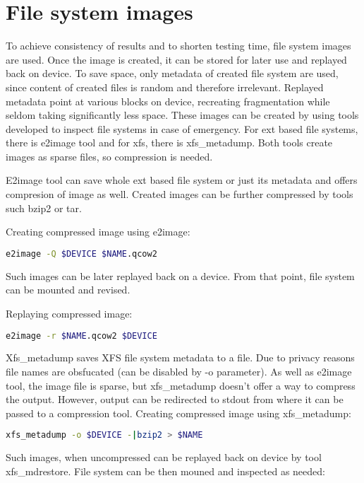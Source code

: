 \documentclass[
  color, %
  table, %
  lof,   %
  lot,   %
]{fithesis3}
\begin{document}
\section{File system images}
To achieve consistency of results and to shorten testing time, file system images are used. Once the image is created, it can be stored for later use and replayed back on device. To save space, only metadata of created file system are used, since content of created files is random and therefore irrelevant. Replayed metadata point at various blocks on device, recreating fragmentation while seldom taking significantly less space. These images can be created by using tools developed to inspect file systems in case of emergency. For ext based file systems, there is e2image tool and for xfs, there is xfs\_metadump. Both tools create images as sparse files, so compression is needed.

E2image tool can save whole ext based file system or just its metadata and offers compresion of image as well. Created images can be further compressed by tools such bzip2 or tar.

\noindent Creating compressed image using e2image:
\begin{lstlisting}[language=bash]
  e2image -Q $DEVICE $NAME.qcow2
\end{lstlisting}

\noindent Such images can be later replayed back on a device. From that point, file system can be mounted and revised.

\noindent Replaying compressed image:
\begin{lstlisting}[language=bash]
  e2image -r $NAME.qcow2 $DEVICE
\end{lstlisting}

Xfs\_metadump saves XFS file system metadata to a file. Due to privacy reasons file names are obsfucated (can be disabled by -o parameter). As well as e2image tool, the image file is sparse, but xfs\_metadump doesn't offer a way to compress the output. However, output can be redirected to stdout from where it can be passed to a compression tool. Creating compressed image using xfs\_metadump:

\begin{lstlisting}[language=bash]
  xfs_metadump -o $DEVICE -|bzip2 > $NAME
\end{lstlisting}

Such images, when uncompressed can be replayed back on device by tool xfs\_mdrestore. File system can be then mouned and inspected as needed:
\end{document}
